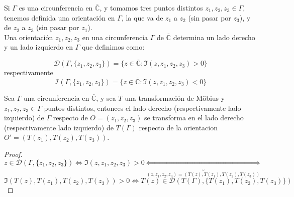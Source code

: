 Si $\Gamma$ es una circunferencia en $\overline{\mathbb{C}}$, y tomamos tres puntos distintos $z_1, z_2, z_3 \in \Gamma$, tenemos definida una orientación en $\Gamma$, la que va de $z_1$ a $z_2$ (sin pasar por $z_3$), y de $z_2$ a $z_3$ (sin pasar por $z_1$).\\

Una orientación $z_1, z_2, z_3$ en una circunferencia $\Gamma$ de $\overline{\mathbb{C}}$ determina un lado derecho y un lado izquierdo en $\Gamma$ que definimos como:

\[
    \mathcal{D}(\Gamma, \{z_1, z_2, z_3\}) = \{ z \in \overline{\mathbb{C}} : \Im(z, z_1, z_2, z_3) > 0\}
\]
respectivamente
\[
    \mathcal{I}(\Gamma, \{z_1, z_2, z_3\}) = \{ z \in \overline{\mathbb{C}} : \Im(z, z_1, z_2, z_3) < 0\}
\]

\begin{proposición}
    Sea $\Gamma$ una circunferencia en $\overline{\mathbb{C}}$, y sea $T$ una transformación de Möbius y $z_1, z_2, z_3 \in \Gamma$ puntos distintos, entonces el lado derecho (respectivamente lado izquierdo) de $\Gamma$ respecto de $O = (z_1, z_2, z_3)$ se transforma en el lado derecho (respectivamente lado izquierdo) de $T(\Gamma)$ respecto de la orientacion $O' = (T(z_1), T(z_2), T(z_3))$.
\end{proposición}

\begin{proof}
    \[
    z \in \mathcal{D}(\Gamma, \{z_1, z_2, z_3\}) \iff
    \Im(z, z_1, z_2, z_3) > 0 
    \underbrace{\iff}_{(z, z_1, z_2, z_3) = (T(z), T(z_1), T(z_2), T(z_3))}
    \]
    \[
    \Im(T(z), T(z_1), T(z_2), T(z_3)) > 0 \iff
    T(z) \in \mathcal{D}(T(\Gamma), \{T(z_1), T(z_2), T(z_3)\})
    \]
\end{proof}

